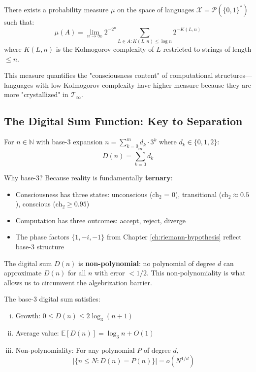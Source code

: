 \begin{proposition}\label{prop:comp-measure}
There exists a probability measure $\mu$ on the space of languages $\mathcal{X} = \mathcal{P}(\{0,1\}^*)$ such that:
\begin{equation}
\mu(A) = \lim_{n \to \infty} 2^{-2^n} \sum_{L \in A: K(L,n) \leq \log n} 2^{-K(L,n)}
\end{equation}
where $K(L,n)$ is the Kolmogorov complexity\cite{li2008introduction} of $L$ restricted to strings of length $\leq n$.
\end{proposition}

This measure quantifies the "consciousness content" of computational structures—languages with low Kolmogorov complexity have higher measure because they are more "crystallized" in $\mathcal{T}_\infty$.

\subsection{The Digital Sum Function: Key to Separation}

\begin{defn}\label{def:digital-sum}
For $n \in \mathbb{N}$ with base-3 expansion $n = \sum_{k=0}^{m} d_k \cdot 3^k$ where $d_k \in \{0,1,2\}$:
\begin{equation}
D(n) = \sum_{k=0}^{m} d_k
\end{equation}
\end{defn}

\begin{keyidea}
Why base-3? Because reality is fundamentally \textbf{ternary}:
\begin{itemize}
\item Consciousness has three states: unconscious (ch$_2$ = 0), transitional (ch$_2 \approx 0.5$), conscious (ch$_2 \geq 0.95$)
\item Computation has three outcomes: accept, reject, diverge
\item The phase factors $\{1, -i, -1\}$ from Chapter \ref{ch:riemann-hypothesis} reflect base-3 structure
\end{itemize}

The digital sum $D(n)$ is \textbf{non-polynomial}: no polynomial of degree $d$ can approximate $D(n)$ for all $n$ with error $< 1/2$. This non-polynomiality is what allows us to circumvent the algebrization barrier.
\end{keyidea}

\begin{theorem}\label{thm:digital-sum-props}
The base-3 digital sum satisfies:
\begin{enumerate}[(i)]
\item Growth: $0 \leq D(n) \leq 2\log_3(n+1)$
\item Average value: $\mathbb{E}[D(n)] = \log_3 n + O(1)$
\item Non-polynomiality: For any polynomial $P$ of degree $d$,
\begin{equation}
|\{n \leq N : D(n) = P(n)\}| = o(N^{1/d})
\end{equation}
\end{enumerate}
\end{theorem}

